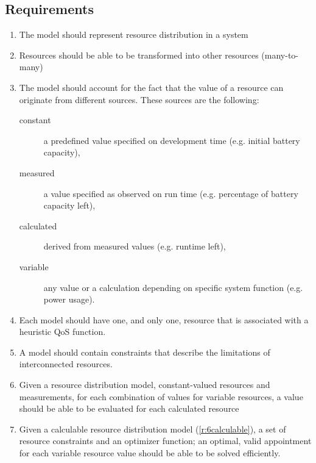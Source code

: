 \subsection{Requirements}
\begin{enumerate}[label=R\rdmid .\arabic*]
\item \label{r:1main} The model should represent resource distribution in a system
\item \label{r:2transform} Resources should be able to be transformed into other resources (many-to-many)
\item \label{r:3resource_types} The model should account for the fact that the value of a resource can originate from different sources. These sources are the following:
\begin{description}
\item[constant] a predefined value specified on development time (e.g. initial battery capacity),
\item[measured] a value specified as observed on run time (e.g. percentage of battery capacity left),
\item[calculated] derived from measured values (e.g. runtime left),
\item[variable] any value or a calculation depending on specific system function (e.g. power usage).
\end{description}
\item \label{r:4optimizer} Each model should have one, and only one, resource that is associated with a heuristic QoS function.
\item \label{r:5constraint} A model should contain constraints that describe the limitations of interconnected resources.
\item \label{r:6calculable}Given a resource distribution model, constant-valued resources and measurements, for each combination of values for variable resources, a value should be able to be evaluated for each calculated resource
\item \label{r:7solvable} Given a calculable  resource distribution model (\ref{r:6calculable}), a set of resource constraints and an optimizer function; an optimal, valid appointment for each variable resource value should be able to be solved efficiently.
\end{enumerate}

